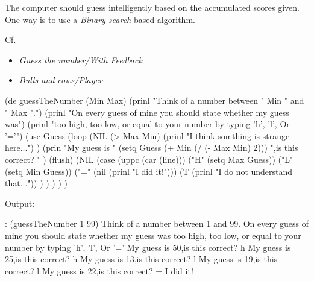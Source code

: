 The computer should guess intelligently based on the accumulated scores
given. One way is to use a \emph{Binary search}
based algorithm.

Cf.

\begin{itemize}
\item
  \emph{Guess the number/With
  Feedback}
\item
  \emph{Bulls and cows/Player}
\end{itemize}


\begin{wideverbatim}

(de guessTheNumber (Min Max)
   (prinl "Think of a number between " Min " and " Max ".")
   (prinl "On every guess of mine you should state whether my guess was")
   (prinl "too high, too low, or equal to your number by typing 'h', 'l', Or '='")
   (use Guess
      (loop
         (NIL (> Max Min)
            (prinl "I think somthing is strange here...") )
         (prin
            "My guess is "
            (setq Guess (+ Min (/ (- Max Min) 2)))
            ",is this correct? " )
         (flush)
         (NIL
            (case (uppc (car (line)))
               ("H" (setq Max Guess))
               ("L" (setq Min Guess))
               ("=" (nil (prinl "I did it!")))
               (T (prinl "I do not understand that...")) ) ) ) ) )

Output:

: (guessTheNumber 1 99)
Think of a number between 1 and 99.
On every guess of mine you should state whether my guess was
too high, too low, or equal to your number by typing 'h', 'l', Or '='
My guess is 50,is this correct? h
My guess is 25,is this correct? h
My guess is 13,is this correct? l
My guess is 19,is this correct? l
My guess is 22,is this correct? =
I did it!

\end{wideverbatim}



% 
